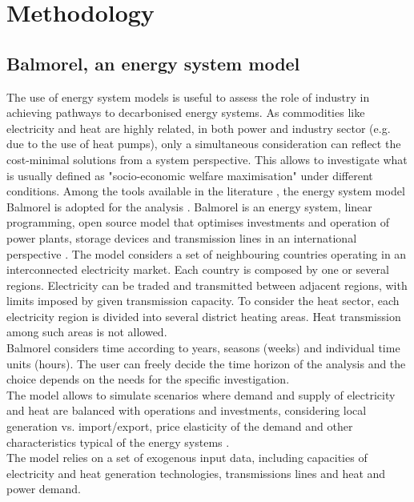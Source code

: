 \documentclass[review]{elsarticle}
\begin{document}

\section{Methodology} \label{meths}

\subsection{Balmorel, an energy system model}

The use of energy system models is useful to assess the role of industry in achieving pathways to decarbonised energy systems. As commodities like electricity and heat are highly related, in both power and industry sector (e.g. due to the use of heat pumps), only a simultaneous consideration can reflect the cost-minimal solutions from a system perspective. This allows to investigate what is usually defined as "socio-economic welfare maximisation" under different conditions. 
Among the tools available in the literature \cite{Connolly2010}, the energy system model Balmorel is adopted for the analysis \cite{balmorel}.
Balmorel is an energy system, linear programming, open source model that optimises investments and operation of power plants, storage devices and transmission lines in an international perspective \cite{Ravn2001}. 
The model considers a set of neighbouring countries operating in an interconnected electricity market. Each country is composed by one or several regions. Electricity can be traded and transmitted between adjacent regions, with limits imposed by given transmission capacity. 
To consider the heat sector, each electricity region is divided into several district heating areas. Heat transmission among such areas is not allowed.  
\\
Balmorel considers time according to years, seasons (weeks) and individual time units (hours). 
The user can freely decide the time horizon of the analysis and the choice depends on the needs for the specific investigation.
\\
The model allows to simulate scenarios where demand and supply of electricity and heat are balanced with operations and investments, considering local generation vs. import/export, price elasticity of the demand and other characteristics typical of the energy systems \cite{Munster2012}. 
\\
The model relies on a set of exogenous input data, including capacities of electricity and heat generation technologies, transmissions lines and heat and power demand. 
\end{document}

